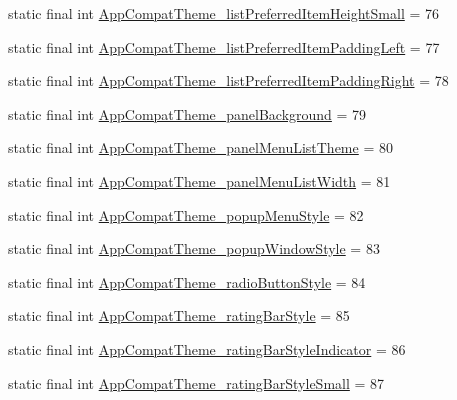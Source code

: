 \begin{DoxyCompactItemize}
\item 
static final int \mbox{\hyperlink{classandroid_1_1support_1_1design_1_1R_1_1styleable_a8a75f7d011f28c7940b2a0ee2418eaa4}{App\+Compat\+Theme\+\_\+list\+Preferred\+Item\+Height\+Small}} = 76
\item 
static final int \mbox{\hyperlink{classandroid_1_1support_1_1design_1_1R_1_1styleable_a12564bc9b7d087833d6fbb43d38126f6}{App\+Compat\+Theme\+\_\+list\+Preferred\+Item\+Padding\+Left}} = 77
\item 
static final int \mbox{\hyperlink{classandroid_1_1support_1_1design_1_1R_1_1styleable_a77c99eb3de957292fbc57a34b689b4c7}{App\+Compat\+Theme\+\_\+list\+Preferred\+Item\+Padding\+Right}} = 78
\item 
static final int \mbox{\hyperlink{classandroid_1_1support_1_1design_1_1R_1_1styleable_a805750ce2fbfa308014705a11b57ba7d}{App\+Compat\+Theme\+\_\+panel\+Background}} = 79
\item 
static final int \mbox{\hyperlink{classandroid_1_1support_1_1design_1_1R_1_1styleable_adfd08ba3f3407d2dd101b228d7ac760a}{App\+Compat\+Theme\+\_\+panel\+Menu\+List\+Theme}} = 80
\item 
static final int \mbox{\hyperlink{classandroid_1_1support_1_1design_1_1R_1_1styleable_a421dc7ff1e048bc72a17a2c6f68ffce6}{App\+Compat\+Theme\+\_\+panel\+Menu\+List\+Width}} = 81
\item 
static final int \mbox{\hyperlink{classandroid_1_1support_1_1design_1_1R_1_1styleable_adc61aa75dda72ba8d03af00d76d398ab}{App\+Compat\+Theme\+\_\+popup\+Menu\+Style}} = 82
\item 
static final int \mbox{\hyperlink{classandroid_1_1support_1_1design_1_1R_1_1styleable_a7c26582c3bfe79830792407693d18411}{App\+Compat\+Theme\+\_\+popup\+Window\+Style}} = 83
\item 
static final int \mbox{\hyperlink{classandroid_1_1support_1_1design_1_1R_1_1styleable_a7aaf0a5c2cd0ecf4edb0fdb371029f43}{App\+Compat\+Theme\+\_\+radio\+Button\+Style}} = 84
\item 
static final int \mbox{\hyperlink{classandroid_1_1support_1_1design_1_1R_1_1styleable_abcb125deda6b4b6451124a6d80bde6e0}{App\+Compat\+Theme\+\_\+rating\+Bar\+Style}} = 85
\item 
static final int \mbox{\hyperlink{classandroid_1_1support_1_1design_1_1R_1_1styleable_aa7a59377306592e0ef0df3be07070657}{App\+Compat\+Theme\+\_\+rating\+Bar\+Style\+Indicator}} = 86
\item 
static final int \mbox{\hyperlink{classandroid_1_1support_1_1design_1_1R_1_1styleable_aece000457864e87bc2e712c789af23a5}{App\+Compat\+Theme\+\_\+rating\+Bar\+Style\+Small}} = 87

\end{DoxyCompactItemize}
